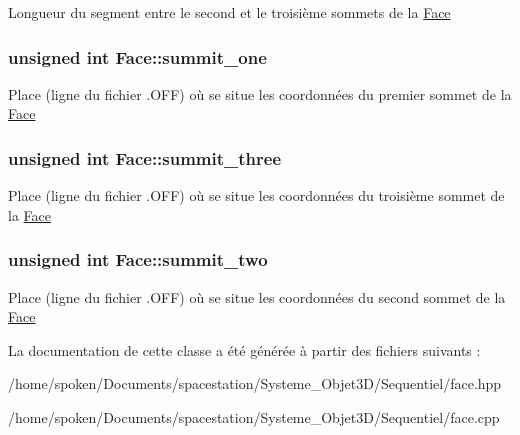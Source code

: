 Longueur du segment entre le second et le troisième sommets de la \hyperlink{class_face}{Face} \hypertarget{class_face_a68ff25f391cfe3ee5ce2b7f13dac64fa}{
\subsubsection[{summit\-\_\-one}]{\setlength{\rightskip}{0pt plus 5cm}unsigned int Face\-::summit\-\_\-one\hspace{0.3cm}{\ttfamily [private]}}}\label{class_face_a68ff25f391cfe3ee5ce2b7f13dac64fa}
Place (ligne du fichier .O\-F\-F) où se situe les coordonnées du premier sommet de la \hyperlink{class_face}{Face} \hypertarget{class_face_af322077aea999dd19dd169bd5bdd4bdf}{
\subsubsection[{summit\-\_\-three}]{\setlength{\rightskip}{0pt plus 5cm}unsigned int Face\-::summit\-\_\-three\hspace{0.3cm}{\ttfamily [private]}}}\label{class_face_af322077aea999dd19dd169bd5bdd4bdf}
Place (ligne du fichier .O\-F\-F) où se situe les coordonnées du troisième sommet de la \hyperlink{class_face}{Face} \hypertarget{class_face_a8d0b2a96bd53dcf7767c2cefe1fcc1f3}{
\subsubsection[{summit\-\_\-two}]{\setlength{\rightskip}{0pt plus 5cm}unsigned int Face\-::summit\-\_\-two\hspace{0.3cm}{\ttfamily [private]}}}\label{class_face_a8d0b2a96bd53dcf7767c2cefe1fcc1f3}
Place (ligne du fichier .O\-F\-F) où se situe les coordonnées du second sommet de la \hyperlink{class_face}{Face} 

La documentation de cette classe a été générée à partir des fichiers suivants \-:\begin{DoxyCompactItemize}
\item 
/home/spoken/\-Documents/spacestation/\-Systeme\-\_\-\-Objet3\-D/\-Sequentiel/face.\-hpp\item 
/home/spoken/\-Documents/spacestation/\-Systeme\-\_\-\-Objet3\-D/\-Sequentiel/face.\-cpp\end{DoxyCompactItemize}
